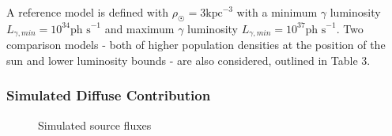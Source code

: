 \documentclass{PoS}
\begin{document}
A reference model is defined with $\rho_{\astrosun} = 3 \text{kpc}^{-3}$ with a minimum $\gamma$ luminosity $L_{\gamma, min} = 10^{34} \text{ph s}^{-1}$ and maximum $\gamma$ luminosity $L_{\gamma, min} = 10^{37} \text{ph s}^{-1}$. Two comparison models - both of higher population densities at the position of the sun and lower luminosity bounds - are also considered, outlined in Table 3.

\begin{table}
\centering
{}
\caption{Parameters for 10 - 500 GeV Galaxy Population Simulations.}
\end{table}

\subsubsection{Simulated Diffuse Contribution}

\begin{figure}
\makeatletter
\def\@captype{table}
\makeatother
\caption{Simulated source fluxes}
\vspace{-10pt}
\end{figure}
\end{document}
